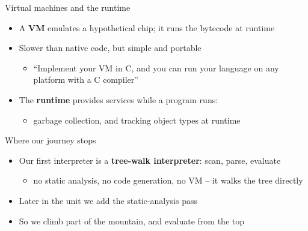 \documentclass[
  ignorenonframetext,
]{beamer}
\providecommand{\tightlist}{%
  \setlength{\itemsep}{0pt}\setlength{\parskip}{0pt}}
\begin{document}
\begin{frame}{Virtual machines and the runtime}
\label{virtual-machines-and-the-runtime}
\begin{itemize}
\tightlist
\item
  A \textbf{VM} emulates a hypothetical chip; it runs the bytecode at
  runtime
\item
  Slower than native code, but simple and portable

  \begin{itemize}
  \tightlist
  \item
    ``Implement your VM in C, and you can run your language on any
    platform with a C compiler''
  \end{itemize}
\item
  The \textbf{runtime} provides services while a program runs:

  \begin{itemize}
  \tightlist
  \item
    garbage collection, and tracking object types at runtime
  \end{itemize}
\end{itemize}

\end{frame}

\begin{frame}{Where our journey stops}
\label{where-our-journey-stops}
\begin{itemize}
\tightlist
\item
  Our first interpreter is a \textbf{tree-walk interpreter}: scan,
  parse, evaluate

  \begin{itemize}
  \tightlist
  \item
    no static analysis, no code generation, no VM -- it walks the tree
    directly
  \end{itemize}
\item
  Later in the unit we add the static-analysis pass
\item
  So we climb part of the mountain, and evaluate from the top
\end{itemize}

\end{frame}
\end{document}
